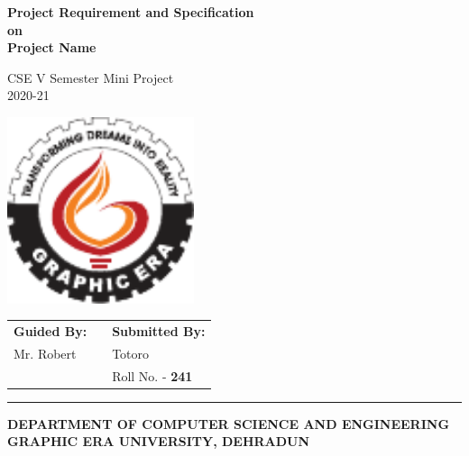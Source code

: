 \documentclass{article}
\begin{document}
\begin{center}
    \bfseries{\huge{Project Requirement and Specification}}\\
    \huge{on}\\
    \huge{Project Name}
\end{center}

\vspace{1mm}

\begin{center}
    {
        \LARGE
        CSE V Semester Mini Project\\
        2020-21
    }
\end{center}

\vspace{4mm}

\begin{center}
    \includegraphics[width=0.41\textwidth]{logo2.pdf}
\end{center}

{
\LARGE
\begin{center}
    \begin{tabular}{m{4.5cm}m{3cm}m{5cm}}
        \textbf{Guided By:} & & \textbf{Submitted By:} \\
        Mr. Robert & & Totoro \\
        & & Roll No. - \textbf{241} \\
    \end{tabular}
\end{center}
}

\vspace{45mm}

\noindent\rule{\textwidth}{0.4pt}

\begin{center}
{
\large
\textbf{DEPARTMENT OF COMPUTER SCIENCE AND ENGINEERING}\\
}
\vspace{3mm}
{
\LARGE
\textbf{GRAPHIC ERA UNIVERSITY, DEHRADUN}
}
\end{center}
\end{document}
